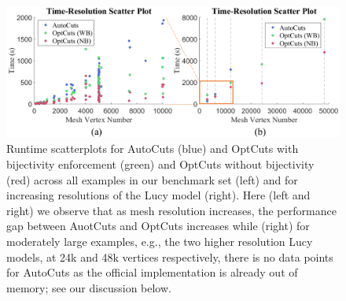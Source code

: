\begin{figure}[t]
\centering
\includegraphics[width=\linewidth]{fig/time_res_compAutoCuts.png}
\caption{Runtime scatterplots for AutoCuts (blue) and OptCuts with bijectivity enforcement (green) and OptCuts without bijectivity (red) across all examples in our benchmark set (left) and for increasing resolutions of the Lucy model (right). Here (left and right) we observe that as mesh resolution increases, the performance gap between AuotCuts and OptCuts increases while (right) for moderately large examples, e.g., the two higher resolution Lucy models, at 24k and 48k vertices respectively, there is no data points for AutoCuts as the official implementation is already out of memory; see our discussion below.
}
\label{fig:time_res_compAutoCuts}
\end{figure}



